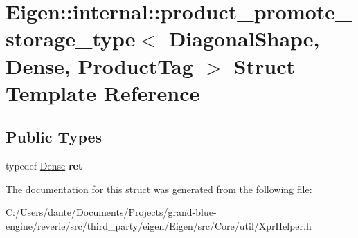 \hypertarget{struct_eigen_1_1internal_1_1product__promote__storage__type_3_01_diagonal_shape_00_01_dense_00_01_product_tag_01_4}{}\section{Eigen\+::internal\+::product\+\_\+promote\+\_\+storage\+\_\+type$<$ Diagonal\+Shape, Dense, Product\+Tag $>$ Struct Template Reference}
\label{struct_eigen_1_1internal_1_1product__promote__storage__type_3_01_diagonal_shape_00_01_dense_00_01_product_tag_01_4}
\subsection*{Public Types}
\begin{DoxyCompactItemize}
\item 
\mbox{\label{struct_eigen_1_1internal_1_1product__promote__storage__type_3_01_diagonal_shape_00_01_dense_00_01_product_tag_01_4_a4934f44fe4b8fd3ea78b8301fa85ac01}} 
typedef \mbox{\hyperlink{struct_eigen_1_1_dense}{Dense}} {\bfseries ret}
\end{DoxyCompactItemize}


The documentation for this struct was generated from the following file\+:\begin{DoxyCompactItemize}
\item 
C\+:/\+Users/dante/\+Documents/\+Projects/grand-\/blue-\/engine/reverie/src/third\+\_\+party/eigen/\+Eigen/src/\+Core/util/Xpr\+Helper.\+h\end{DoxyCompactItemize}
